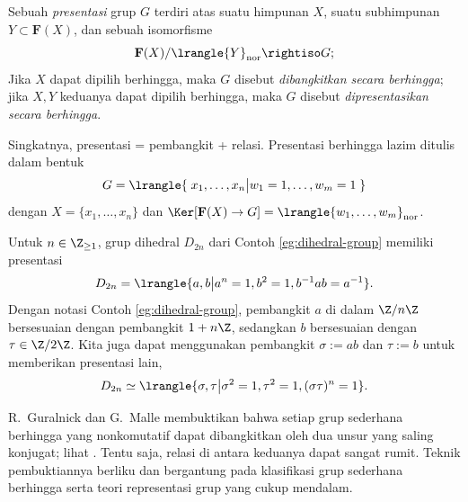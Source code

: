 \begin{definition}
	Sebuah \emph{presentasi} grup $G$ terdiri atas suatu himpunan $X$, suatu subhimpunan $Y \subset \mathbf{F}(X)$, dan sebuah isomorfisme
	\[ \mathbf{F}(X)/\lrangle{Y}_{\mathrm{nor}} \rightiso G; \]
	Jika $X$ dapat dipilih berhingga, maka $G$ disebut \emph{dibangkitkan secara berhingga}; jika $X, Y$ keduanya dapat dipilih berhingga, maka $G$ disebut \emph{dipresentasikan secara berhingga}.  
\end{definition}
Singkatnya, presentasi = pembangkit + relasi. Presentasi berhingga lazim ditulis dalam bentuk
\[ G = \lrangle{ \; x_1, \ldots, x_n  \big| w_1=1, \ldots, w_m=1 \; } \]
dengan $X = \{x_1, \ldots, x_n\}$ dan $\Ker[\mathbf{F}(X) \to G] = \lrangle{w_1, \ldots, w_m}_\text{nor}$.

\begin{example}\label{eg:dihedral-presentation}
	Untuk $n \in \Z_{\geq 1}$, grup dihedral $D_{2n}$ dari Contoh \ref{eg:dihedral-group} memiliki presentasi
	\[ D_{2n} = \lrangle{ a, b \big| a^n=1, b^2=1, b^{-1}ab = a^{-1}  }. \]
	Dengan notasi Contoh \ref{eg:dihedral-group}, pembangkit $a$ di dalam $\Z/n\Z$ bersesuaian dengan pembangkit $1+n\Z$, sedangkan $b$ bersesuaian dengan $\tau \in \Z/2\Z$. Kita juga dapat menggunakan pembangkit $\sigma := ab$ dan $\tau := b$ untuk memberikan presentasi lain,
	\[ D_{2n} \simeq \lrangle{ \sigma, \tau \big| \sigma^2=1, \tau^2 = 1, (\sigma\tau)^n=1}. \]
\end{example}

\begin{example}
	R.\ Guralnick dan G.\ Malle membuktikan bahwa setiap grup sederhana berhingga yang nonkomutatif dapat dibangkitkan oleh dua unsur yang saling konjugat; lihat \cite[Corollary 8.3]{GM12}. Tentu saja, relasi di antara keduanya dapat sangat rumit. Teknik pembuktiannya berliku dan bergantung pada klasifikasi grup sederhana berhingga serta teori representasi grup yang cukup mendalam.
\end{example}

